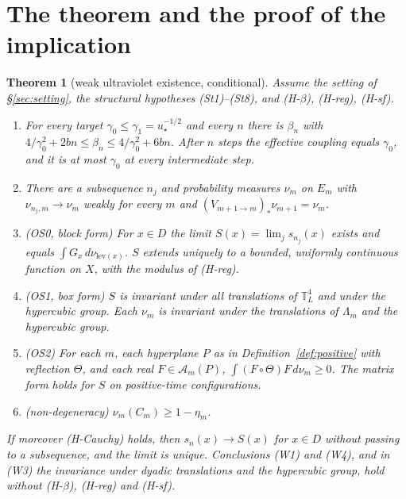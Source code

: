 \documentclass[11pt,a4paper]{article}
\newtheorem{theorem}{Theorem}[section]
\theoremstyle{definition}
\theoremstyle{remark}
\newcommand{\T}{\mathbb{T}}
\begin{document}
\section{The theorem and the proof of the implication}\label{sec:thm}

\begin{theorem}[weak ultraviolet existence, conditional]\label{thm:W}
Assume the setting of \S\ref{sec:setting}, the structural hypotheses (St1)--(St8), and (H-$\beta$), (H-reg), (H-sf).
\begin{enumerate}[label=(W\arabic*),leftmargin=3em,start=0]
\item For every target $\gamma_0\le\gamma_1=u_\star^{-1/2}$ and every $n$ there is $\beta_n$ with $4/\gamma_0^2+2bn\le\beta_n\le4/\gamma_0^2+6bn$. After $n$ steps the effective coupling equals $\gamma_0$, and it is at most $\gamma_0$ at every intermediate step.
\item There are a subsequence $n_j$ and probability measures $\nu_m$ on $E_m$ with $\nu_{n_j,m}\to\nu_m$ weakly for every $m$ and $(V_{m+1\to m})_*\nu_{m+1}=\nu_m$.
\item (OS0, block form) For $x\in D$ the limit $S(x)=\lim_js_{n_j}(x)$ exists and equals $\int G_x\,d\nu_{\mathrm{lev}(x)}$. $S$ extends uniquely to a bounded, uniformly continuous function on $X$, with the modulus of (H-reg).
\item (OS1, box form) $S$ is invariant under all translations of $\T^4_L$ and under the hypercubic group. Each $\nu_m$ is invariant under the translations of $\Lambda_m$ and the hypercubic group.
\item (OS2) For each $m$, each hyperplane $P$ as in Definition~\ref{def:positive} with reflection $\Theta$, and each real $F\in\mathcal A_m(P)$, $\int(F\circ\Theta)F\,d\nu_m\ge0$. The matrix form holds for $S$ on positive-time configurations.
\item (non-degeneracy) $\nu_m(C_m)\ge1-\eta_m$.
\end{enumerate}
If moreover (H-Cauchy) holds, then $s_n(x)\to S(x)$ for $x\in D$ without passing to a subsequence, and the limit is unique. Conclusions (W1) and (W4), and in (W3) the invariance under dyadic translations and the hypercubic group, hold without (H-$\beta$), (H-reg) and (H-sf).
\end{theorem}
\end{document}
